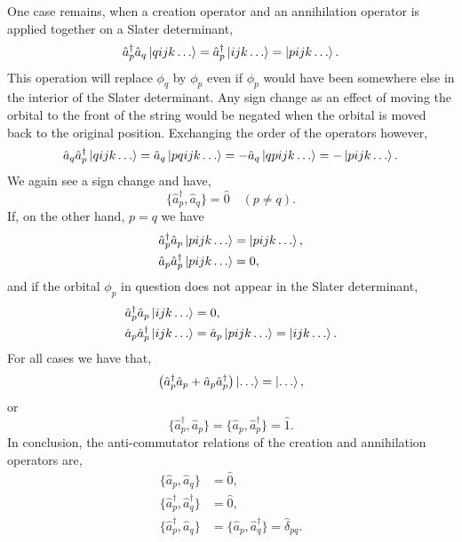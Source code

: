     One case remains, when a creation operator and an annihilation operator is
    applied together on a Slater determinant,
    \begin{equation}
        \hat{a}_p^\dagger \hat{a}_q \ket{qijk \dots} 
            = \hat{a}_p^\dagger \ket{ijk \dots}
            = \ket{pijk \dots}.
    \end{equation}
    This operation will replace $\phi_q$ by $\phi_p$ even if $\phi_p$ would have
    been somewhere else in the interior of the Slater determinant. Any sign change
    as an effect of moving the orbital to the front of the string would be negated
    when the orbital is moved back to the original position. Exchanging the order
    of the operators however,
    \begin{equation}
        \hat{a}_q \hat{a}_p^\dagger \ket{qijk \dots} 
            = \hat{a}_q \ket{pqijk \dots} 
            = -\hat{a}_q \ket{qpijk \dots}
            = -\ket{pijk \dots}.
    \end{equation}
    We again see a sign change and have,
    \begin{equation}
        \{\hat{a}_p^\dagger, \hat{a}_q\} = \hat{0} \quad (p \neq q).
    \end{equation}
    If, on the other hand, $p=q$ we have 
    \begin{equation}
        \begin{aligned}
            \hat{a}_p^\dagger \hat{a}_p \ket{pijk \dots} &= \ket{pijk \dots}, \\
            \hat{a}_p \hat{a}_p^\dagger \ket{pijk \dots} &= 0,
        \end{aligned}
    \end{equation}
    and if the orbital $\phi_p$ in question does not appear in the Slater 
    determinant,
    \begin{equation}
        \begin{aligned}
            \hat{a}_p^\dagger \hat{a}_p \ket{ijk \dots} &= 0, \\
            \hat{a}_p \hat{a}_p^\dagger \ket{ijk \dots} &= 
                \hat{a}_p\ket{pijk \dots} = \ket{ijk \dots}.           
        \end{aligned}
    \end{equation} 
    For all cases we have that,
    \begin{equation}
        \left(\hat{a}_p^\dagger \hat{a}_p + \hat{a}_p \hat{a}_p^\dagger \right)
        \ket{\dots} = \ket{\dots},
    \end{equation}
    or
    \begin{equation}
        \{\hat{a}_p^\dagger, \hat{a}_p\} = \{\hat{a}_p, \hat{a}_p^\dagger\} = \hat{1}.
    \end{equation}
    In conclusion, the anti-commutator relations of the creation and annihilation
    operators are,
    \begin{align}
        \{\hat{a}_p, \hat{a}_q\} &= \hat{0}, \\
        \{\hat{a}_p^\dagger, \hat{a}_q^\dagger\} &= \hat{0}, \\
        \{\hat{a}_p^\dagger, \hat{a}_q\} &= \{\hat{a}_p, \hat{a}_q^\dagger\} 
         = \hat{\delta}_{pq}.
    \end{align}

